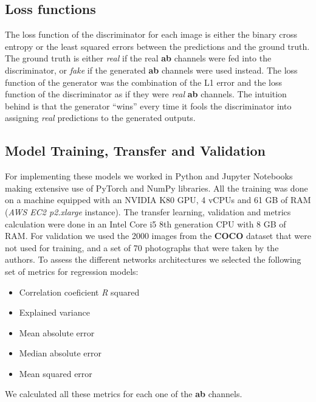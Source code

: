 \documentclass[
]{article}
\providecommand{\tightlist}{%
  \setlength{\itemsep}{0pt}\setlength{\parskip}{0pt}}
\begin{document}
\hypertarget{loss-functions}{%
\subsection{Loss functions}\label{loss-functions}}

The loss function of the discriminator for each image is either the
binary cross entropy or the least squared errors between the predictions
and the ground truth. The ground truth is either \emph{real} if the real
\textbf{ab} channels were fed into the discriminator, or \emph{fake} if
the generated \textbf{ab} channels were used instead. The loss function
of the generator was the combination of the L1 error and the loss
function of the discriminator as if they were \emph{real} \textbf{ab}
channels. The intuition behind is that the generator ``wins'' every time
it fools the discriminator into assigning \emph{real} predictions to the
generated outputs.

\hypertarget{model-training-transfer-and-validation}{%
\subsection{Model Training, Transfer and
Validation}\label{model-training-transfer-and-validation}}

For implementing these models we worked in Python and Jupyter Notebooks
making extensive use of PyTorch and NumPy libraries. All the training
was done on a machine equipped with an NVIDIA K80 GPU, 4 vCPUs and 61 GB
of RAM (\emph{AWS EC2 p2.xlarge} instance). The transfer learning,
validation and metrics calculation were done in an Intel Core i5 8th
generation CPU with 8 GB of RAM. For validation we used the 2000 images
from the \textbf{COCO} dataset that were not used for training, and a
set of 70 photographs that were taken by the authors. To assess the
different networks architectures we selected the following set of
metrics for regression models:

\begin{itemize}
\tightlist
\item
  Correlation coeficient \emph{R} squared
\item
  Explained variance
\item
  Mean absolute error
\item
  Median absolute error
\item
  Mean squared error
\end{itemize}

We calculated all these metrics for each one of the \textbf{ab}
channels.
\end{document}
